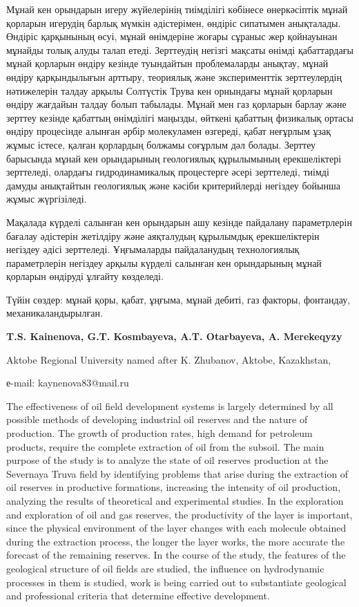 Мұнай кен орындарын игеру жүйелерінің тиімділігі көбінесе өнеркәсіптік
мұнай қорларын игерудің барлық мүмкін әдістерімен, өндіріс сипатымен
анықталады. Өндіріс қарқынының өсуі, мұнай өнімдеріне жоғары сұраныс жер
қойнауынан мұнайды толық алуды талап етеді. Зерттеудің негізгі мақсаты
өнімді қабаттардағы мұнай қорларын өндіру кезінде туындайтын
проблемаларды анықтау, мұнай өндіру қарқындылығын арттыру, теориялық
және эксперименттік зерттеулердің нәтижелерін талдау арқылы Солтүстік
Трува кен орнындағы мұнай қорларын өндіру жағдайын талдау болып
табылады. Мұнай мен газ қорларын барлау және зерттеу кезінде қабаттың
өнімділігі маңызды, өйткені қабаттың физикалық ортасы өндіру процесінде
алынған әрбір молекуламен өзгереді, қабат неғұрлым ұзақ жұмыс істесе,
қалған қорлардың болжамы соғұрлым дәл болады. Зерттеу барысында мұнай
кен орындарының геологиялық құрылымының ерекшеліктері зерттеледі,
олардағы гидродинамикалық процестерге әсері зерттеледі, тиімді дамуды
анықтайтын геологиялық және кәсіби критерийлерді негіздеу бойынша жұмыс
жүргізіледі.

Мақалада күрделі салынған кен орындарын ашу кезінде пайдалану
параметрлерін бағалау әдістерін жетілдіру және аяқталудың құрылымдық
ерекшеліктерін негіздеу әдісі зерттеледі. Ұңғымаларды пайдаланудың
технологиялық параметрлерін негіздеу арқылы күрделі салынған кен
орындарының мұнай қорларын өндіруді ұлғайту көзделеді.

Түйін сөздер: мұнай қоры, қабат, ұңғыма, мұнай дебиті, газ факторы,
фонтандау, механикаландырылған.


\begin{center}
{\bfseries T.S. Kainenova\envelope, G.T. Kosmbayeva, A.T.
Otarbayeva, A. Merekeqyzy}

Aktobe Regional University named after K. Zhubanov, Aktobe, Kazakhstan,

е-mail: kaynenova83@mail.ru
\end{center}

The effectiveness of oil field development systems is largely determined
by all possible methods of developing industrial oil reserves and the
nature of production. The growth of production rates, high demand for
petroleum products, require the complete extraction of oil from the
subsoil. The main purpose of the study is to analyze the state of oil
reserves production at the Severnaya Truva field by identifying problems
that arise during the extraction of oil reserves in productive
formations, increasing the intensity of oil production, analyzing the
results of theoretical and experimental studies. In the exploration and
exploration of oil and gas reserves, the productivity of the layer is
important, since the physical environment of the layer changes with each
molecule obtained during the extraction process, the longer the layer
works, the more accurate the forecast of the remaining reserves. In the
course of the study, the features of the geological structure of oil
fields are studied, the influence on hydrodynamic processes in them is
studied, work is being carried out to substantiate geological and
professional criteria that determine effective development.

